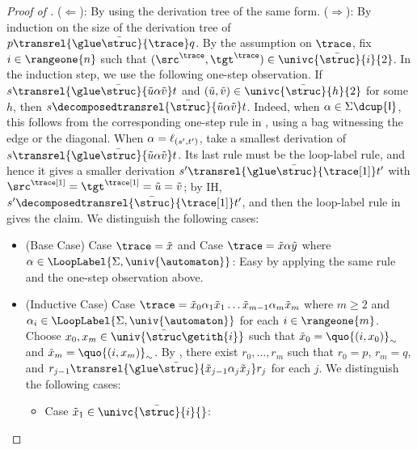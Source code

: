 \documentclass[10pt,a4paper]{article}
\theoremstyle{definition}
\theoremstyle{remark}
\DeclarePairedDelimiter\set{\{}{\}}
\DeclarePairedDelimiter\tuple{(}{)}
\newcommand{\const}[1]{\mathsf{#1}}
\newcommand{\mul}[1]{\bar{#1}}
\newcommand{\id}{\const{I}}
\begin{document}
\begin{proof}[Proof of ]
    ($\Longleftarrow$):
    By using the derivation tree of the same form.
    ($\Longrightarrow$):
    By induction on the size of the derivation tree of $p \transrel{\glue \mul{\struc}}{\trace} q$.
    By the assumption on $\trace$, fix $i \in \rangeone{n}$ such that $\tuple{\src^{\trace}, \tgt^{\trace}} \in \univc{\mul{\struc}}{i}{2}$.
    In the induction step, we use the following one-step observation.
    If $s \transrel{\glue \mul{\struc}}{\tilde{u} \alpha \tilde{v}} t$ and $\tuple{\tilde{u}, \tilde{v}} \in \univc{\mul{\struc}}{h}{2}$ for some $h$,
    then $s \decomposedtransrel{\mul{\struc}}{\tilde{u} \alpha \tilde{v}} t$.
    Indeed, when $\alpha \in \Sigma \dcup \set{\id}$, this follows from the corresponding one-step rule in , using a bag witnessing the edge or the diagonal.
    When $\alpha = \ell_{\tuple{s', t'}}$, take a smallest derivation of $s \transrel{\glue \mul{\struc}}{\tilde{u} \alpha \tilde{v}} t$.
    Its last rule must be the loop-label rule, and hence it gives a smaller derivation
    $s' \transrel{\glue \mul{\struc}}{\trace[1]} t'$ with $\src^{\trace[1]} = \tgt^{\trace[1]} = \tilde{u} = \tilde{v}$;
    by IH, $s' \decomposedtransrel{\mul{\struc}}{\trace[1]} t'$, and then the loop-label rule in  gives the claim.
    We distinguish the following cases:
    \begin{itemize}
        \item (Base Case) Case $\trace = \tilde{x}$ and Case $\trace = \tilde{x} \alpha \tilde{y}$ where $\alpha \in \LoopLabel{\Sigma, \univ{\automaton}}$:
        Easy by applying the same rule and the one-step observation above.
        \item (Inductive Case) Case $\trace = \tilde{x}_0 \alpha_1 \tilde{x}_1 \dots \tilde{x}_{m-1} \alpha_{m} \tilde{x}_{m}$
        where $m \ge 2$ and $\alpha_{i} \in \LoopLabel{\Sigma, \univ{\automaton}}$ for each $i \in \rangeone{m}$.
        Choose $x_0, x_m \in \univ{\mul{\struc}\getith{i}}$ such that
        $\tilde{x}_0 = \quo{\tuple{i, x_0}}_{\sim}$ and $\tilde{x}_m = \quo{\tuple{i, x_m}}_{\sim}$.
        By ,
        there exist $r_0, \dots, r_{m}$ such that
        $r_0 = p$,
        $r_{m} = q$, and
        $r_{j-1} \transrel{\glue \mul{\struc}}{\tilde{x}_{j-1} \alpha_{j} \tilde{x}_{j}} r_{j}$ for each $j$.
        We distinguish the following cases:
        \begin{itemize}
            \item Case $\tilde{x}_1 \in \univc{\mul{\struc}}{i}{}$:

\end{itemize}
\end{itemize}
\end{proof}
\end{document}
